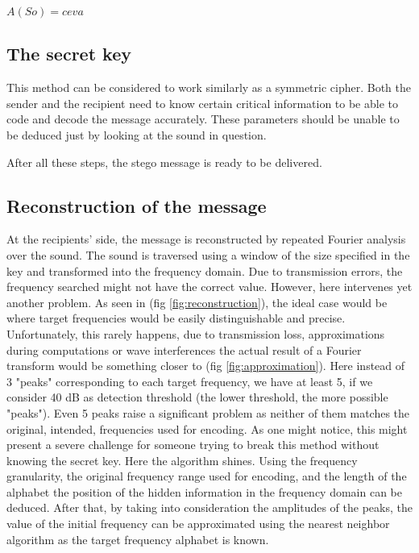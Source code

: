 \documentclass[12pt]{report}
\begin{document}
\begin{center}
\begin{math}
A(So) = ceva 
\end{math}
\end{center}


\subsection{The secret key}
This method can be considered to work similarly as a symmetric cipher. Both the sender and the recipient need to know certain critical information to be able to code and decode the message accurately. These parameters should be unable to be deduced just by looking at the sound in question.


After all these steps, the stego message is ready to be delivered.
\subsection{Reconstruction of the message}  
At the recipients' side, the message is reconstructed by repeated Fourier analysis over the sound. The sound is traversed using a window of the size specified in the key and transformed into the frequency domain. Due to transmission errors, the frequency searched might not have the correct value. However, here intervenes yet another problem. As seen in (fig \ref{fig:reconstruction}), the ideal case would be where target frequencies would be easily distinguishable and precise. Unfortunately, this rarely happens, due to transmission loss, approximations during computations or wave interferences the actual result of a Fourier transform would be something closer to (fig \ref{fig:approximation}). Here instead of 3 "peaks" corresponding to each target frequency, we have at least 5, if we consider 40 dB as detection threshold (the lower threshold, the more possible "peaks"). Even 5 peaks raise a significant problem as neither of them matches the original, intended, frequencies used for encoding. As one might notice, this might present a severe challenge for someone trying to break this method without knowing the secret key. Here the algorithm shines. Using the frequency granularity, the original frequency range used for encoding, and the length of the alphabet the position of the hidden information in the frequency domain can be deduced. After that, by taking into consideration the amplitudes of the peaks, the value of the initial frequency can be approximated using the nearest neighbor algorithm as the target frequency alphabet is known. 
\end{document}
